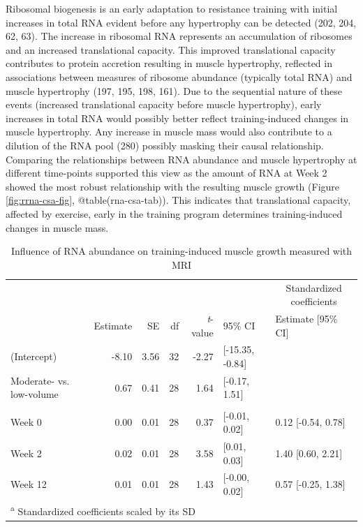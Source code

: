 \documentclass[twoside,10pt]{gihclass} %
\begin{document}
Ribosomal biogenesis is an early adaptation to resistance training with initial increases in total RNA evident before any hypertrophy can be detected
(202, 204, 62, 63).
The increase in ribosomal RNA represents an accumulation of ribosomes and an increased translational capacity. This improved translational capacity contributes to protein accretion resulting in muscle hypertrophy, reflected in associations between measures of ribosome abundance (typically total RNA) and muscle hypertrophy
(197, 195, 198, 161).
Due to the sequential nature of these events (increased translational capacity before muscle hypertrophy), early increases in total RNA would possibly better reflect training-induced changes in muscle hypertrophy.
Any increase in muscle mass would also contribute to a dilution of the RNA pool
(280)
possibly masking their causal relationship.
Comparing the relationships between RNA abundance and muscle hypertrophy at different time-points supported this view as the amount of RNA at Week 2 showed the most robust relationship with the resulting muscle growth (Figure \ref{fig:rrna-csa-fig}, @table(rna-csa-tab)). This indicates that translational capacity, affected by exercise, early in the training program determines training-induced changes in muscle mass.
\begin{table}

\caption{\label{tab:rna-csa-tab}Influence of RNA abundance on training-induced muscle growth measured with MRI}
\centering
\fontsize{8}{10}\selectfont
\begin{tabular}[t]{lrrrrll}
\toprule
\multicolumn{6}{c}{ } & \multicolumn{1}{c}{Standardized coefficients} \\
\cmidrule(l{3pt}r{3pt}){7-7}
 & Estimate & SE & df & \textit{t}-value & 95\% CI & Estimate [95\% CI]\\
\midrule
(Intercept) & -8.10 & 3.56 & 32 & -2.27 & [-15.35, -0.84] & \\
Moderate- vs. low-volume & 0.67 & 0.41 & 28 & 1.64 & [-0.17, 1.51] & \\
\addlinespace[0.3em]
\multicolumn{7}{l}{\textbf{RNA abundance (ng mg\textsuperscript{-1})}}\\
\hspace{1em}Week 0 & 0.00 & 0.01 & 28 & 0.37 & [-0.01, 0.02] & 0.12 [-0.54, 0.78]\\
\hspace{1em}Week 2 & 0.02 & 0.01 & 28 & 3.58 & [0.01, 0.03] & 1.40 [0.60, 2.21]\\
\hspace{1em}Week 12 & 0.01 & 0.01 & 28 & 1.43 & [-0.00, 0.02] & 0.57 [-0.25, 1.38]\\
\bottomrule
\multicolumn{7}{l}{\textsuperscript{a} Standardized coefficients scaled by its SD}\\
\end{tabular}
\end{table}
\end{document}
